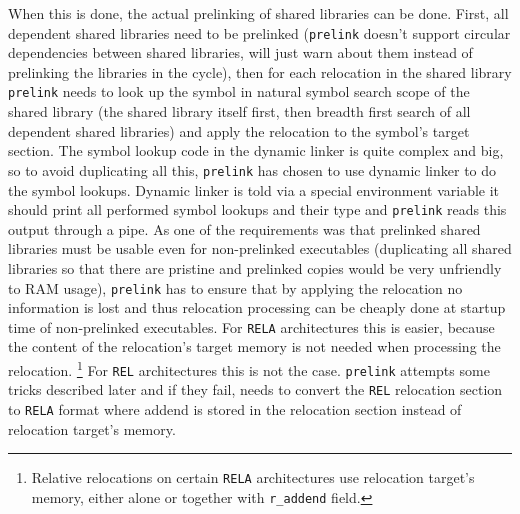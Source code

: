 \documentclass[twoside]{article}
\def\tts#1{\texttt{\small #1}}
\begin{document}
When this is done, the actual prelinking of shared libraries can be done.
First, all dependent shared libraries need to be prelinked (\tts{prelink}
doesn't support circular dependencies between shared libraries, will just
warn about them instead of prelinking the libraries in the cycle), then for each
relocation in the shared library \tts{prelink} needs to look up the symbol
in natural symbol search scope of the shared library (the shared library
itself first, then breadth first search of all dependent shared libraries) and
apply the relocation to the symbol's target section.  The symbol lookup code
in the dynamic linker is quite complex and big, so to avoid duplicating all
this, \tts{prelink} has chosen to use dynamic linker to do the symbol lookups.
Dynamic linker is told via a special environment variable it should print
all performed symbol lookups and their type and \tts{prelink} reads this
output through a pipe.  As one of the requirements was that
prelinked shared libraries must be usable even for non-prelinked executables
(duplicating all shared libraries so that there are pristine and prelinked
copies would be very unfriendly to RAM usage), \tts{prelink} has to ensure
that by applying the relocation no information is lost and thus relocation
processing can be cheaply done at startup time of non-prelinked executables.
For \tts{RELA} architectures this is easier, because the content
of the relocation's target memory is not needed when processing the relocation.
\footnote{Relative relocations on certain \tts{RELA} architectures use
relocation target's memory, either alone or together with \tts{r\_addend}
field.}  For \tts{REL} architectures this is not the case.
\tts{prelink} attempts some tricks described
later and if they fail, needs to convert the \tts{REL} relocation section
to \tts{RELA} format where addend is stored in the relocation section
instead of relocation target's memory.
\end{document}
